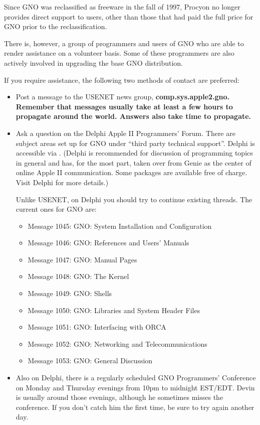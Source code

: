 \documentclass{report}
\begin{document}
Since GNO was reclassified as freeware in the fall of 1997, 
Procyon no longer provides direct support to users, other than those
that had paid the full price for GNO prior to the reclassification.

There is, however, a group of programmers and users of GNO who are
able to render assistance on a volunteer basis.  Some of these programmers
are also actively involved in upgrading the base GNO distribution.

If you require assistance, the following two methods of contact are
preferred:
\begin{itemize}
\item
Post a message to the USENET news group, \bf comp.sys.apple2.gno\rm.
Remember that messages usually take at least a few hours to propagate
around the world.  Answers also take time to propagate.

\item
Ask a question on the Delphi Apple II Programmers' Forum.  There
are subject areas set up for GNO under ``third party technical support''.
Delphi is accessible via .  (Delphi is
recommended for discussion of programming topics in general and
has, for the most part, taken over from Genie as the center of 
online Apple II communication.  Some packages are available free of
charge.  Visit Delphi for more details.)

Unlike USENET, on Delphi you should try to continue existing threads.
The current ones for GNO are:

	\begin{itemize}
	\item	Message 1045: GNO: System Installation and Configuration
	\item	Message 1046: GNO: References and Users' Manuals
	\item	Message 1047: GNO: Manual Pages
	\item	Message 1048: GNO: The Kernel
	\item	Message 1049: GNO: Shells
	\item	Message 1050: GNO: Libraries and System Header Files
	\item	Message 1051: GNO: Interfacing with ORCA
	\item	Message 1052: GNO: Networking and Telecommunications
	\item	Message 1053: GNO: General Discussion
	\end{itemize}

\item
Also on Delphi, there is a regularly scheduled GNO Programmers' Conference
on Monday and Thursday evenings from 10pm to midnight EST/EDT.  Devin
is usually around those evenings, although he sometimes misses the 
conference.  If you don't catch him the first time, be sure to try again
another day.
\end{itemize}
\end{document}
